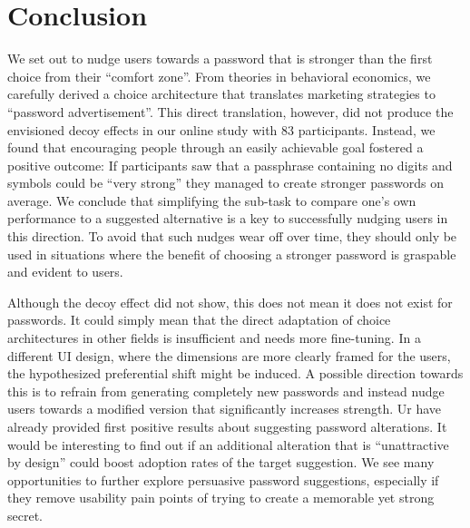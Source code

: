 \section{Conclusion}
We set out to nudge users towards a password that is stronger than the first choice from their ``comfort zone''. From theories in behavioral economics, we carefully derived a choice architecture that translates marketing strategies to ``password advertisement''. This direct translation, however, did not produce the envisioned decoy effects in our online study with 83 participants. Instead, we found that encouraging people through an easily achievable goal fostered a positive outcome: If participants saw that a passphrase containing no digits and symbols could be ``very strong'' they managed to create stronger passwords on average. We conclude that simplifying the sub-task to compare one's own performance to a suggested alternative is a key to successfully nudging users in this direction. To avoid that such nudges wear off over time, they should only be used in situations where the benefit of choosing a stronger password is graspable and evident to users. 


Although the decoy effect did not show, this does not mean it does not exist for passwords. It could simply mean that the direct adaptation of choice architectures in other fields is insufficient and needs more fine-tuning. In a different UI design, where the dimensions are more clearly framed for the users, the hypothesized preferential shift might be induced. A possible direction towards this is to refrain from generating completely new passwords and instead nudge users towards a modified version that significantly increases strength. Ur \etal have already provided first positive results about suggesting password alterations. It would be interesting to find out if an additional alteration that is ``unattractive by design'' could boost adoption rates of the target suggestion. We see many opportunities to further explore persuasive password suggestions, especially if they remove usability pain points of trying to create a memorable yet strong secret. 


